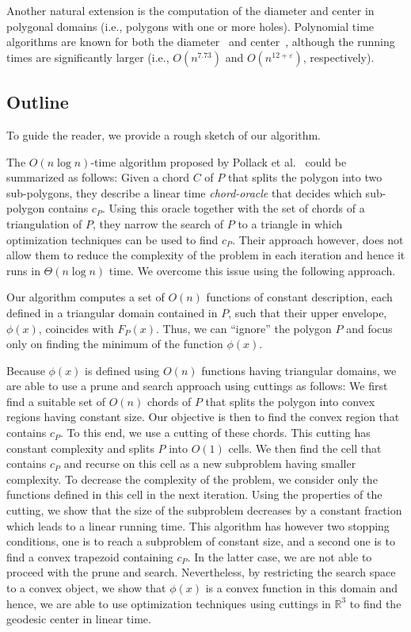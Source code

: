 \documentclass[a4paper,UKenglish]{lipics}
\newcommand{\F}[2]{\ensuremath{F_{\scriptscriptstyle #1}(#2)}}
\newcommand{\cp}{\ensuremath{c_P}}
\begin{document}
Another natural extension is the computation of the diameter and center in polygonal domains (i.e., polygons with one or more holes). Polynomial time algorithms are known for both the diameter~\cite{bko-gdpd-13} and center~\cite{bko-cgcpd-14}, although the running times are significantly larger (i.e., $O(n^{7.73})$ and $O(n^{12+\varepsilon})$, respectively).

\subsection{Outline}
To guide the reader, we provide a rough sketch of our algorithm.

The $O(n \log n)$-time algorithm proposed by Pollack et al.~\cite{pollackComputingCenter} could be summarized as follows: 
Given a chord $C$ of $P$ that splits the polygon into two sub-polygons, they describe a linear time \emph{chord-oracle} that decides which sub-polygon contains $\cp$. Using this oracle together with the set of chords of a triangulation of $P$, they narrow the search of $P$ to a triangle in which optimization techniques can be used to find $\cp$.
Their approach however, does not allow them to reduce the complexity of the problem in each iteration and hence it runs in $\Theta(n\log n)$ time. We overcome this issue using the following approach.

Our algorithm computes a set of $O(n)$ functions of constant description, 
each defined in a triangular domain contained in $P$,
such that their upper envelope, $\phi(x)$, coincides with $\F{P}{x}$.
Thus, we can ``ignore'' the polygon $P$ and focus only on finding the minimum of the function $\phi(x)$.

Because $\phi(x)$ is defined using $O(n)$ functions having triangular domains, 
we are able to use a prune and search approach using cuttings as follows:
We first find a suitable set of $O(n)$ chords of $P$ that splits the polygon into convex regions having constant size.
Our objective is then to find the convex region that contains $\cp$. 
To this end, we use a cutting of these chords. This cutting has constant complexity and splits $P$ into $O(1)$ cells. 
We then find the cell that contains $\cp$ and recurse on this cell as a new subproblem having smaller complexity. 
To decrease the complexity of the problem, we consider only the functions defined in this cell in the next iteration. 
Using the properties of the cutting, we show that the size of the subproblem decreases by a constant fraction which leads to a linear running time. 
This algorithm has however two stopping conditions, 
one is to reach a subproblem of constant size, 
and a second one is to find a convex trapezoid containing $\cp$.
In the latter case, we are not able to proceed with the prune and search. 
Nevertheless, by restricting the search space to a convex object, 
we show that $\phi(x)$ is a convex function in this domain and hence, 
we are able to use optimization techniques using 
cuttings in $\mathbb{R}^3$ to find the geodesic center in linear time. 
\end{document}
